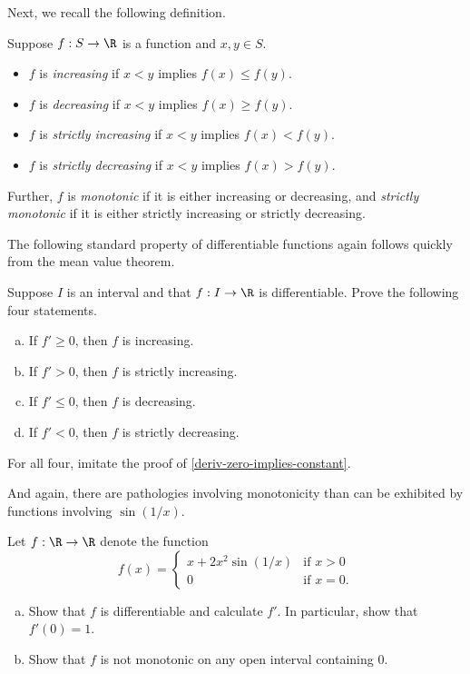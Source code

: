 Next, we recall the following definition. 

\begin{definition}
	Suppose $f : S \to \R$ is a function and $x, y \in S$. 
	\begin{itemize}
		\item $f$ is \emph{increasing} if $x < y$ implies $f(x) \leq f(y)$. 
		\item $f$ is \emph{decreasing} if $x < y$ implies $f(x) \geq f(y)$.
		\item $f$ is \emph{strictly increasing} if $x < y$ implies $f(x) < f(y)$. 
		\item $f$ is \emph{strictly decreasing} if $x < y$ implies $f(x) > f(y)$. 
	\end{itemize}
Further, $f$ is \emph{monotonic} if it is either increasing or decreasing, and \emph{strictly monotonic} if it is either strictly increasing or strictly decreasing. 
\end{definition}

The following standard property of differentiable functions again follows quickly from the mean value theorem. 

\begin{exercise} \label{deriv-increasing-decreasing}
	Suppose $I$ is an interval and that $f : I \to \R$ is differentiable. Prove the following four statements. 
	\begin{enumerate}[(a)]
		\item If $f' \geq 0$, then $f$ is increasing. 
		\item If $f' > 0$, then $f$ is strictly increasing. 
		\item If $f' \leq 0$, then $f$ is decreasing. 
		\item If $f' < 0$, then $f$ is strictly decreasing. 
	\end{enumerate} 
	\begin{hint} For all four, imitate the proof of \cref{deriv-zero-implies-constant}. \end{hint}
\end{exercise}

And again, there are pathologies involving monotonicity than can be exhibited by functions involving $\sin(1/x)$. 

\begin{exercise} \label{positive-not-monotonic}
	Let $f : \R \to \R$ denote the function
	\[ f(x) = \begin{cases} x + 2x^2 \sin(1/x) & \text{if } x > 0 \\ 0 & \text{if } x = 0. \end{cases} \]
	\begin{enumerate}[(a)]
		\item Show that $f$ is differentiable and calculate $f'$. In particular, show that $f'(0) = 1$. 
		\item Show that $f$ is not monotonic on any open interval containing 0.  
	\end{enumerate}
\end{exercise}

